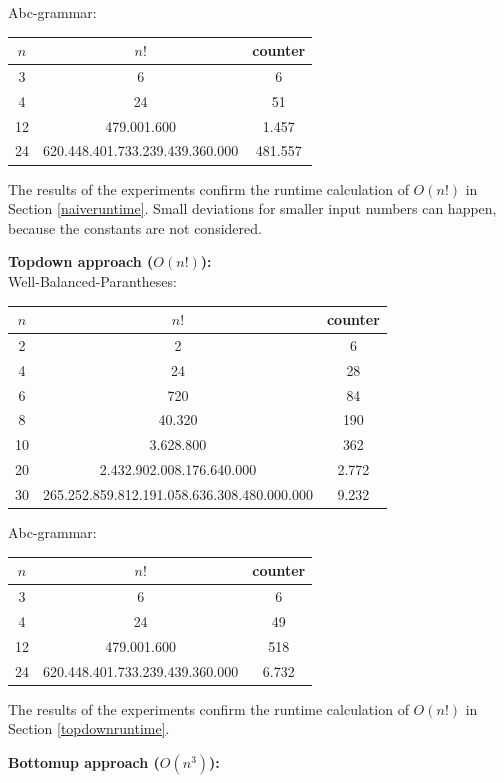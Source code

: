 \documentclass[a4paper, 11pt]{article}
\begin{document}
Abc-grammar: 

\begin{tabular}{|c|c|c|}
\hline
$n$ & $n!$ & counter \\
\hline
3& 6 & 6\\
4& 24 & 51\\
12& 479.001.600 & 1.457\\
24& 620.448.401.733.239.439.360.000 & 481.557\\
\hline
\end{tabular}

The results of the experiments confirm the runtime calculation of $O(n!)$ in Section \ref{naiveruntime}. Small deviations for smaller input numbers can happen, because the constants are not considered.



\textbf{Topdown approach ($O(n!)$):} \\
Well-Balanced-Parantheses: 

\begin{tabular}{|c|c|c|}
\hline
$n$ & $n!$ & counter \\
\hline
2& 2 & 6\\
4& 24 & 28\\
6& 720 & 84\\
8& 40.320 & 190\\
10& 3.628.800 & 362 \\
20& 2.432.902.008.176.640.000 & 2.772\\
30& 265.252.859.812.191.058.636.308.480.000.000 & 9.232\\
\hline
\end{tabular}

Abc-grammar: 

\begin{tabular}{|c|c|c|}
\hline
$n$ & $n!$ & counter \\
\hline
3& 6 & 6\\
4& 24 & 49\\
12& 479.001.600 & 518\\
24& 620.448.401.733.239.439.360.000 & 6.732\\
\hline
\end{tabular}

The results of the experiments confirm the runtime calculation of $O(n!)$ in Section \ref{topdownruntime}.



\newpage
\textbf{Bottomup approach ($O(n^3)$):} \\
\end{document}
